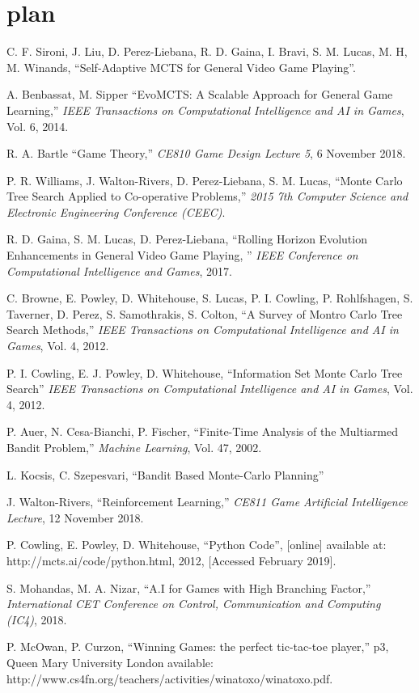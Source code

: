 \documentclass[conference]{IEEEtran}
\begin{document}
\section{plan}

\begin{thebibliography}{9}

C. F. Sironi, J. Liu, D. Perez-Liebana, R. D. Gaina, I. Bravi, S. M. Lucas, M. H, M. Winands, ``Self-Adaptive MCTS for General Video Game Playing''. 

A. Benbassat, M. Sipper
``EvoMCTS: A Scalable Approach for General Game Learning,'' 
{\em IEEE Transactions on Computational Intelligence and AI in Games}, Vol. 6, 2014.

R. A. Bartle ``Game Theory,'' {\em CE810 Game Design Lecture 5}, 6 November 2018. 

P. R. Williams, J. Walton-Rivers, D. Perez-Liebana, S. M. Lucas, ``Monte Carlo Tree Search Applied to Co-operative Problems,'' {\em 2015 7th Computer Science and Electronic Engineering Conference (CEEC)}.

R. D. Gaina, S. M. Lucas, D. Perez-Liebana, ``Rolling Horizon Evolution Enhancements in General Video Game Playing, '' {\em IEEE Conference on Computational Intelligence and Games}, 2017.

C. Browne, E. Powley, D. Whitehouse, S. Lucas, P. I. Cowling, P. Rohlfshagen, S. Taverner, D. Perez, S. Samothrakis, S. Colton,  
``A Survey of Montro Carlo Tree Search Methods,'' 
{\em IEEE Transactions on Computational Intelligence and AI in Games}, Vol. 4, 2012.

P. I. Cowling, E. J. Powley, D. Whitehouse, 
``Information Set Monte Carlo Tree Search'' 
{\em IEEE Transactions on Computational Intelligence and AI in Games}, Vol. 4, 2012.

P. Auer, N. Cesa-Bianchi, P. Fischer, ``Finite-Time Analysis of the Multiarmed Bandit Problem,'' {\em Machine Learning}, Vol. 47, 2002.

L. Kocsis, C. Szepesvari, ``Bandit Based Monte-Carlo Planning'' 

J. Walton-Rivers, ``Reinforcement Learning,'' {\em CE811 Game Artificial Intelligence Lecture}, 12 November 2018. 

P. Cowling, E. Powley, D. Whitehouse, ``Python Code'', [online] available at: http://mcts.ai/code/python.html, 2012, [Accessed February 2019].

S. Mohandas, M. A. Nizar, ``A.I for Games with High Branching Factor,'' {\em International CET Conference on Control, Communication and Computing (IC4)}, 2018.

P. McOwan, P. Curzon, ``Winning Games: the perfect tic-tac-toe player,'' p3, Queen Mary University London available: http://www.cs4fn.org/teachers/activities/winatoxo/winatoxo.pdf. 

\end{thebibliography}
\end{document}
